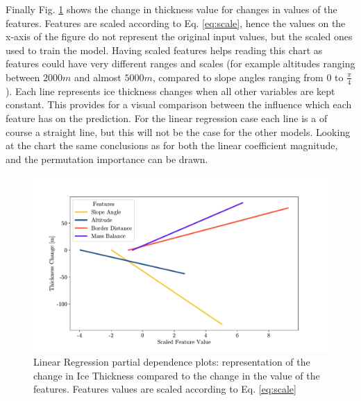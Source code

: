 Finally Fig. \ref{fig:lr-pdp} shows the change in thickness value for changes in values of the features. Features are scaled according to Eq. \ref{eq:scale}, hence the values on the x-axis of the figure do not represent the original input values, but the scaled ones used to train the model. Having scaled features helps reading this chart as features could have very different ranges and scales (for example altitudes ranging between  $2000m$ and almost $5000m$, compared to slope angles ranging from $0$ to $\frac{\pi}{4}$). Each line represents ice thickness changes when all other variables are kept constant. This provides for a visual comparison between the influence which each feature has on the prediction. For the linear regression case each line is a of course a straight line, but this will not be the case for the other models. Looking at the chart the same conclusions as for both the linear coefficient magnitude, and the permutation importance can be drawn.

\begin{figure}[!tp]
	\centering		  
	\includegraphics[width=1.\textwidth]{figures/LR_pdp.pdf}
	\caption{Linear Regression partial dependence plots: representation of the change in Ice Thickness compared to the change in the value of the features. Features values are scaled according to Eq. \ref{eq:scale}}
	\label{fig:lr-pdp}
\end{figure}

